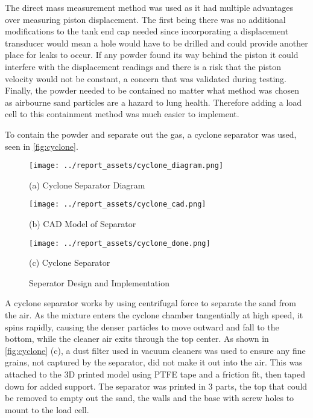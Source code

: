 The direct mass measurement method was used as it had multiple advantages over measuring piston displacement. The first being there was no additional modifications to the tank end cap needed since incorporating a displacement transducer would mean a hole would have to be drilled and could provide another place for leaks to occur. If any powder found its way behind the piston it could interfere with the displacement readings and there is a risk that the piston velocity would not be constant, a concern that was validated during testing. Finally, the powder needed to be contained no matter what method was chosen as airbourne sand particles are a hazard to lung health. Therefore adding a load cell to this containment method was much easier to implement.

To contain the powder and separate out the gas, a cyclone separator was used, seen in \autoref{fig:cyclone}.
\begin{figure}[htbp]
    \centering

    \begin{minipage}{0.3\textwidth}
        \centering
        \texttt{[image: ../report\_assets/cyclone\_diagram.png]}
        \caption*{(a) Cyclone Separator Diagram}
    \end{minipage}
    \hfill
    \begin{minipage}{0.3\textwidth}
        \centering
        \texttt{[image: ../report\_assets/cyclone\_cad.png]}
        \caption*{(b) CAD Model of Separator}
    \end{minipage}
    \hfill
    \begin{minipage}{0.3\textwidth}
        \centering
        \texttt{[image: ../report\_assets/cyclone\_done.png]}
        \caption*{(c) Cyclone Separator}
    \end{minipage}
    \caption{Seperator Design and Implementation}\label{fig:cyclone}
\end{figure}
A cyclone separator works by using centrifugal force to separate the sand from the air. As the mixture enters the cyclone chamber tangentially at high speed, it spins rapidly, causing the denser particles to move outward and fall to the bottom, while the cleaner air exits through the top center. As shown in \autoref{fig:cyclone} (c), a dust filter used in vacuum cleaners was used to ensure any fine grains, not captured by the separator, did not make it out into the air. This was attached to the 3D printed model using PTFE tape and a friction fit, then taped down for added support. The separator was printed in 3 parts, the top that could be removed to empty out the sand, the walls and the base with screw holes to mount to the load cell.

